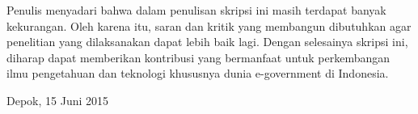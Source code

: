 Penulis menyadari bahwa dalam penulisan skripsi ini masih terdapat banyak kekurangan. Oleh karena itu, saran dan kritik yang membangun dibutuhkan agar penelitian yang dilaksanakan dapat lebih baik lagi. Dengan selesainya skripsi ini, diharap dapat memberikan kontribusi yang bermanfaat untuk perkembangan ilmu pengetahuan dan teknologi khususnya dunia e-government di Indonesia.
\vspace*{0.1cm}
\begin{flushright}
Depok, 15 Juni 2015\\[0.1cm]
\vspace*{1cm}
\penulis

\end{flushright}